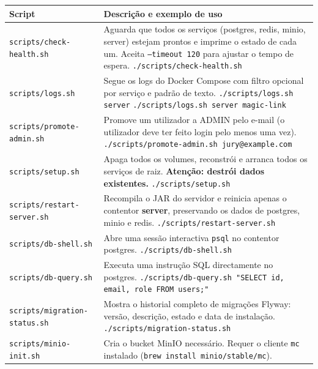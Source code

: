 \documentclass[12pt,a4paper]{article}
\newcommand{\cmd}[1]{\texttt{\small\color{accent}#1}}
\newcommand{\service}[1]{\textbf{\textsf{#1}}}
\begin{document}
\begin{center}
\begin{tabularx}{\textwidth}{lX}
\toprule
\textbf{Script} & \textbf{Descrição e exemplo de uso} \\
\midrule
\cmd{scripts/check-health.sh} &
  Aguarda que todos os serviços (postgres, redis, minio, server) estejam prontos e imprime o estado de cada um. Aceita \texttt{--timeout 120} para ajustar o tempo de espera.\newline
  \texttt{./scripts/check-health.sh} \\[0.5em]
\cmd{scripts/logs.sh} &
  Segue os logs do Docker Compose com filtro opcional por serviço e padrão de texto.\newline
  \texttt{./scripts/logs.sh server} \quad \texttt{./scripts/logs.sh server magic-link} \\[0.5em]
\cmd{scripts/promote-admin.sh} &
  Promove um utilizador a ADMIN pelo e-mail (o utilizador deve ter feito login pelo menos uma vez).\newline
  \texttt{./scripts/promote-admin.sh jury@example.com} \\[0.5em]
\cmd{scripts/setup.sh} &
  Apaga todos os volumes, reconstrói e arranca todos os serviços de raiz. \textbf{Atenção: destrói dados existentes.}\newline
  \texttt{./scripts/setup.sh} \\[0.5em]
\cmd{scripts/restart-server.sh} &
  Recompila o JAR do servidor e reinicia apenas o contentor \service{server}, preservando os dados de postgres, minio e redis.\newline
  \texttt{./scripts/restart-server.sh} \\[0.5em]
\cmd{scripts/db-shell.sh} &
  Abre uma sessão interactiva \texttt{psql} no contentor postgres.\newline
  \texttt{./scripts/db-shell.sh} \\[0.5em]
\cmd{scripts/db-query.sh} &
  Executa uma instrução SQL directamente no postgres.\newline
  \texttt{./scripts/db-query.sh "SELECT id, email, role FROM users;"} \\[0.5em]
\cmd{scripts/migration-status.sh} &
  Mostra o historial completo de migrações Flyway: versão, descrição, estado e data de instalação.\newline
  \texttt{./scripts/migration-status.sh} \\[0.5em]
\cmd{scripts/minio-init.sh} &
  Cria o bucket MinIO necessário. Requer o cliente \texttt{mc} instalado (\texttt{brew install minio/stable/mc}).\newline

\end{tabularx}
\end{center}
\end{document}
